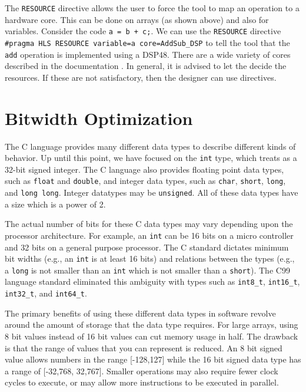 \begin{aside}
The \lstinline{RESOURCE} directive allows the user to force the \VHLS tool to map an operation to a hardware core. This can be done on arrays (as shown above) and also for variables. Consider the code \lstinline{a = b + c;}. We can use the \lstinline{RESOURCE} directive \lstinline{#pragma HLS RESOURCE variable=a core=AddSub_DSP} to tell the \VHLS tool that the \lstinline{add} operation is implemented using a DSP48. There are a wide variety of cores described in the \VHLS documentation \cite{ug902}. In general, it is advised to let the \VHLS decide the resources. If these are not satisfactory, then the designer can use directives.
\end{aside}





\section{Bitwidth Optimization}

The C language provides many different data types to describe different kinds of behavior.  Up until this point, we have focused on the \lstinline{int} type, which \VHLS treats as a 32-bit signed integer.   The C language also provides floating point data types, such as \lstinline{float} and \lstinline{double}, and integer data types, such as \lstinline{char}, \lstinline{short}, \lstinline{long}, and \lstinline{long long}. Integer datatypes may be \lstinline{unsigned}. All of these data types have a size which is a power of 2.

The actual number of bits for these C data types may vary depending upon the processor architecture. For example, an \lstinline{int} can be 16 bits on a micro controller and 32 bits on a general purpose processor. The C standard dictates minimum bit widths (e.g., an \lstinline{int} is at least 16 bits) and relations between the types (e.g., a \lstinline{long} is not smaller than an \lstinline{int} which is not smaller than a \lstinline{short}).  The C99 language standard eliminated this ambiguity with types such as \lstinline{int8_t}, \lstinline{int16_t}, \lstinline{int32_t}, and \lstinline{int64_t}.  

The primary benefits of using these different data types in software revolve around the amount of storage that the data type requires. For large arrays, using 8 bit values instead of 16 bit values can cut memory usage in half. The drawback is that the range of values that you can represent is reduced. An 8 bit signed value allows numbers in the range [-128,127] while the 16 bit signed data type has a range of [-32,768, 32,767].  Smaller operations may also require fewer clock cycles to execute, or may allow more instructions to be executed in parallel.

